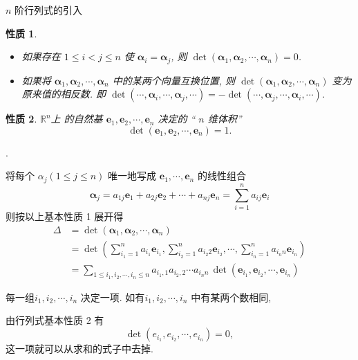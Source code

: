 \documentclass[10pt,punct]{ctexbeamer}
\newtheorem{pr3}{性质}
\begin{document}
\begin{frame}{$n$ 阶行列式的引入}
    \begin{pr3}
        \begin{itemize}
            \item 如果存在 $1 \leqslant i<j \leqslant n$ 使 $\boldsymbol{\alpha}_i=\boldsymbol{\alpha}_j$, 则 $\operatorname{det}\left(\boldsymbol{\alpha}_1, \boldsymbol{\alpha}_2, \cdots, \boldsymbol{\alpha}_n\right)=0$.

            \item  如果将 $\boldsymbol{\alpha}_1, \boldsymbol{\alpha}_2, \cdots, \boldsymbol{\alpha}_n$ 中的某两个向量互换位置, 则 $\operatorname{det}\left(\boldsymbol{\alpha}_1, \boldsymbol{\alpha}_2, \cdots, \boldsymbol{\alpha}_n\right)$ 变为 原来值的相反数. 即
            $\operatorname{det}\left(\cdots, \boldsymbol{\alpha}_i, \cdots, \boldsymbol{\alpha}_j, \cdots\right)=-\operatorname{det}\left(\cdots, \boldsymbol{\alpha}_j, \cdots, \boldsymbol{\alpha}_i, \cdots\right)$.
        \end{itemize}
    \end{pr3}



    \begin{pr3}
        $\mathbb{R}^n$上 的自然基 $\boldsymbol{e}_1, \boldsymbol{e}_2, \cdots, \boldsymbol{e}_n$ 决定的 “ $n$ 维体积” $$\operatorname{det}\left( \boldsymbol{e}_1, \boldsymbol{e}_2, \cdots, \boldsymbol{e}_n\right)=1.$$
    \end{pr3}.
\end{frame}


\begin{frame}
    将每个 $\alpha_j(1 \leqslant j \leqslant n)$ 唯一地写成 $\boldsymbol{e}_1, \cdots, \boldsymbol{e}_n$ 的线性组合
    $$
    \boldsymbol{\alpha}_j=a_{1 j} \boldsymbol{e}_1+a_{2 j} \boldsymbol{e}_2+\cdots+a_{n j} \boldsymbol{e}_n=\sum_{i=1}^n a_{i j} \boldsymbol{e}_i
    $$
    则按以上基本性质 1 展开得
    $$
    \begin{aligned}
        \Delta &=\operatorname{det}\left(\boldsymbol{\alpha}_1, \boldsymbol{\alpha}_2, \cdots, \boldsymbol{\alpha}_n\right) \\
        &=\operatorname{det}\left(\sum_{i_1=1}^n a_{i_1} \boldsymbol{e}_{i_1}, \sum_{i_2=1}^n a_{i_2 2} \boldsymbol{e}_{i_2}, \cdots, \sum_{i_n=1}^n a_{i_n n} \boldsymbol{e}_{i_n}\right) \\
        &=\sum_{1 \leqslant i_1, i_2, \cdots, i_n \leqslant n} a_{i_1, 1} a_{i_2, 2} \cdots a_{i_n n} \, \operatorname{det}\left(\boldsymbol{e}_{i_1}, \boldsymbol{e}_{i_2}, \cdots, \boldsymbol{e}_{i_n}\right)
    \end{aligned}
    $$

    每一组$i_1, i_2, \cdots, i_n$ 决定一项.
    如有$i_1, i_2, \cdots, i_n$ 中有某两个数相同,

    由行列式基本性质 2 有 $$\operatorname{det}\left(e_{i_1}, e_{i_2}, \cdots, e_{i_n}\right)=0,$$
    这一项就可以从求和的式子中去掉.
\end{frame}
\end{document}
